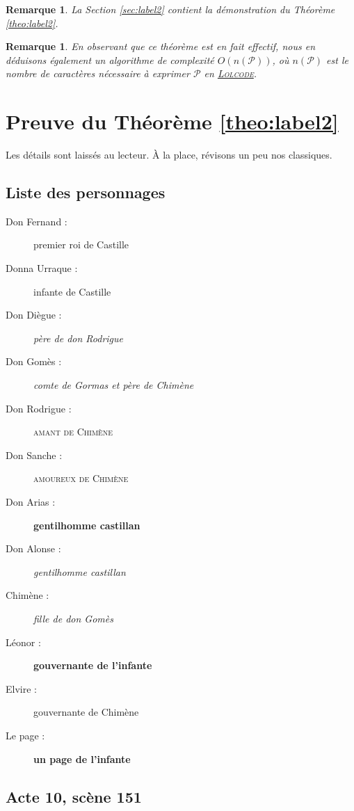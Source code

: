 \documentclass{article}
\newtheorem{remark}[definition]{Remarque}
\begin{document}
	\begin{remark}
		La Section \ref{sec:label2} contient la démonstration du Théorème \ref{theo:label2}.
	\end{remark}

	\begin{remark}
		En observant que ce théorème est en fait effectif, nous en déduisons également un algorithme de complexité $O(n(\mathcal{P}))$, où $n(\mathcal{P})$ est le nombre de caractères nécessaire à exprimer $\mathcal{P}$ en \href{https://lolcode.org/}{\textsc{Lolcode}}.
	\end{remark}

	\section{Preuve du Théorème \ref{theo:label2}}
	Les détails sont laissés au lecteur. À la place, révisons un peu nos classiques.
	\label{sec:label2}

	\subsection{Liste des personnages}
	\label{subsec:label1}

	\begin{description}
		\item[Don Fernand :] premier roi de Castille
		\item[Donna Urraque :] infante de Castille
		\item[Don Diègue :] \emph{père de don Rodrigue}
		\item[Don Gomès :] \emph{comte de Gormas et père de Chimène}
		\item[Don Rodrigue :] \textsc{amant de Chimène}
		\item[Don Sanche :] \textsc{amoureux de Chimène}
		\item[Don Arias :] \textbf{gentilhomme castillan}
		\item[Don Alonse :] \emph{gentilhomme castillan}
		\item[Chimène :] \emph{fille de don Gomès}
		\item[Léonor :] \textbf{gouvernante de l’infante}
		\item[Elvire :] gouvernante de Chimène
		\item[Le page :] \textbf{un page de l’infante}
	\end{description}

	\subsection{Acte 10, scène 151}
	\label{subsec:label2}
\end{document}
